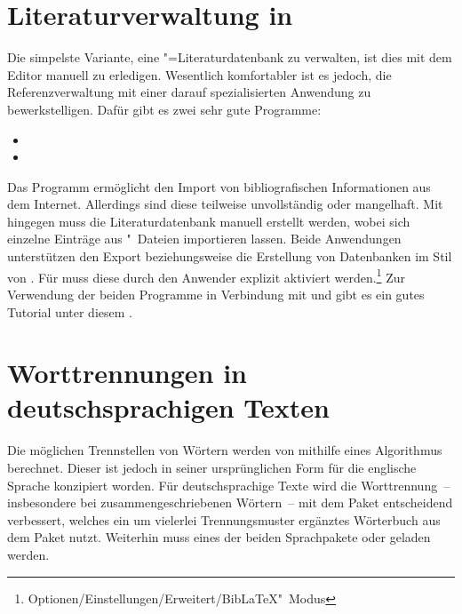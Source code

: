\section{%
  Literaturverwaltung in %
}

%
Die simpelste Variante, eine "=Literaturdatenbank zu verwalten, 
ist dies mit dem Editor manuell zu erledigen. Wesentlich komfortabler ist es 
jedoch, die Referenzverwaltung mit einer darauf spezialisierten Anwendung zu 
bewerkstelligen. Dafür gibt es zwei sehr gute Programme:
%
\begin{itemize}
\item {}
\item {}
\end{itemize}
%
Das Programm  ermöglicht den Import von bibliografischen 
Informationen aus dem Internet. Allerdings sind diese teilweise unvollständig 
oder mangelhaft. Mit  hingegen muss die Literaturdatenbank 
manuell erstellt werden, wobei sich einzelne Einträge aus "~Dateien 
importieren lassen. Beide Anwendungen unterstützen den Export beziehungsweise 
die Erstellung von Datenbanken im Stil von . Für 
 muss diese durch den Anwender explizit aktiviert 
werden.\footnote{Optionen/Einstellungen/Erweitert/BibLaTeX"~Modus} 
Zur Verwendung der beiden Programme in Verbindung mit  und 
 gibt es ein gutes Tutorial unter diesem
.



\section{%
  Worttrennungen in deutschsprachigen Texten%
  \label{sec:tips:hyphenation}%
}

%
Die möglichen Trennstellen von Wörtern werden von  mithilfe 
eines Algorithmus berechnet. Dieser ist jedoch in seiner ursprünglichen Form 
für die englische Sprache konzipiert worden. Für deutschsprachige Texte wird 
die Worttrennung~-- insbesondere bei zusammengeschriebenen Wörtern~-- mit dem 
Paket  entscheidend verbessert, welches ein um vielerlei 
Trennungsmuster ergänztes Wörterbuch aus dem Paket  
nutzt. Weiterhin muss eines der beiden Sprachpakete  oder
 geladen werden. 

